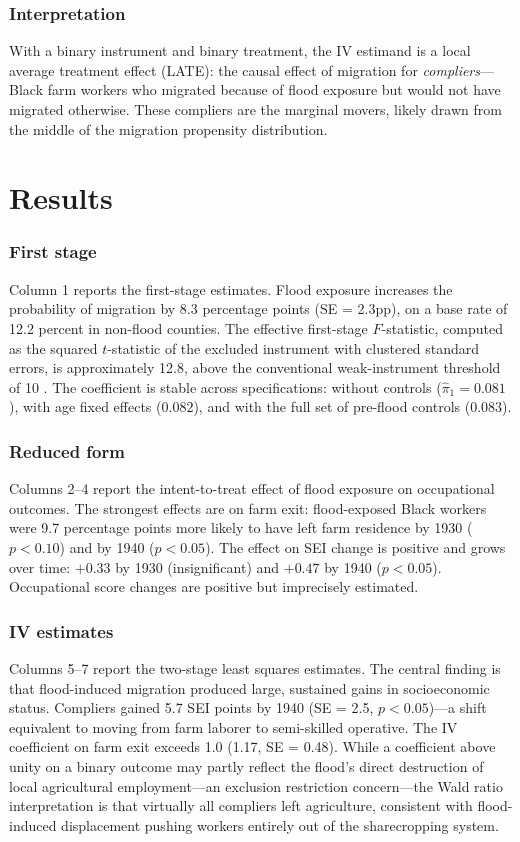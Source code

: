 \documentclass[12pt]{article}
\begin{document}
\subsubsection*{Interpretation} With a binary instrument and binary treatment, the IV estimand is a local average treatment effect (LATE): the causal effect of migration for \textit{compliers}---Black farm workers who migrated because of flood exposure but would not have migrated otherwise. These compliers are the marginal movers, likely drawn from the middle of the migration propensity distribution.


\section{Results}

\subsubsection*{First stage}  Column 1 reports the first-stage estimates. Flood exposure increases the probability of migration by 8.3 percentage points (SE = 2.3pp), on a base rate of 12.2 percent in non-flood counties. The effective first-stage $F$-statistic, computed as the squared $t$-statistic of the excluded instrument with clustered standard errors, is approximately 12.8, above the conventional weak-instrument threshold of 10 \citep{stock_yogo_2005}. The coefficient is stable across specifications: without controls ($\hat{\pi}_1 = 0.081$), with age fixed effects ($0.082$), and with the full set of pre-flood controls ($0.083$).

\subsubsection*{Reduced form} Columns 2--4 report the intent-to-treat effect of flood exposure on occupational outcomes. The strongest effects are on farm exit: flood-exposed Black workers were 9.7 percentage points more likely to have left farm residence by 1930 ($p < 0.10$) and by 1940 ($p < 0.05$). The effect on SEI change is positive and grows over time: $+0.33$ by 1930 (insignificant) and $+0.47$ by 1940 ($p < 0.05$). Occupational score changes are positive but imprecisely estimated.

\subsubsection*{IV estimates} Columns 5--7 report the two-stage least squares estimates. The central finding is that flood-induced migration produced large, sustained gains in socioeconomic status. Compliers gained 5.7 SEI points by 1940 (SE = 2.5, $p < 0.05$)---a shift equivalent to moving from farm laborer to semi-skilled operative. The IV coefficient on farm exit exceeds 1.0 (1.17, SE = 0.48). While a coefficient above unity on a binary outcome may partly reflect the flood's direct destruction of local agricultural employment---an exclusion restriction concern---the Wald ratio interpretation is that virtually all compliers left agriculture, consistent with flood-induced displacement pushing workers entirely out of the sharecropping system.
\end{document}
